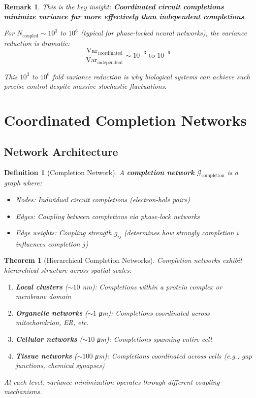 \documentclass[12pt,a4paper]{article}
\newtheorem{theorem}{Theorem}
\newtheorem{definition}{Definition}
\newtheorem{remark}{Remark}
\begin{document}
\begin{remark}
This is the key insight: \textbf{Coordinated circuit completions minimize variance far more effectively than independent completions}.

For $N_{\text{coupled}} \sim 10^3$ to $10^6$ (typical for phase-locked neural networks), the variance reduction is dramatic:
\begin{equation}
\frac{\text{Var}_{\text{coordinated}}}{\text{Var}_{\text{independent}}} \sim 10^{-3} \text{ to } 10^{-6}
\end{equation}

This $10^3$ to $10^6$ fold variance reduction is why biological systems can achieve such precise control despite massive stochastic fluctuations.
\end{remark}

\section{Coordinated Completion Networks}

\subsection{Network Architecture}

\begin{definition}[Completion Network]
\label{def:completion_network}
A \textbf{completion network} $\mathcal{G}_{\text{completion}}$ is a graph where:
\begin{itemize}
\item Nodes: Individual circuit completions (electron-hole pairs)
\item Edges: Coupling between completions via phase-lock networks
\item Edge weights: Coupling strength $g_{ij}$ (determines how strongly completion $i$ influences completion $j$)
\end{itemize}
\end{definition}

\begin{theorem}[Hierarchical Completion Networks]
\label{thm:hierarchical_completion}
Completion networks exhibit hierarchical structure across spatial scales:
\begin{enumerate}
\item \textbf{Local clusters} ($\sim 10$ nm): Completions within a protein complex or membrane domain
\item \textbf{Organelle networks} ($\sim 1$ μm): Completions coordinated across mitochondrion, ER, etc.
\item \textbf{Cellular networks} ($\sim 10$ μm): Completions spanning entire cell
\item \textbf{Tissue networks} ($\sim 100$ μm): Completions coordinated across cells (e.g., gap junctions, chemical synapses)
\end{enumerate}

At each level, variance minimization operates through different coupling mechanisms.
\end{theorem}
\end{document}

